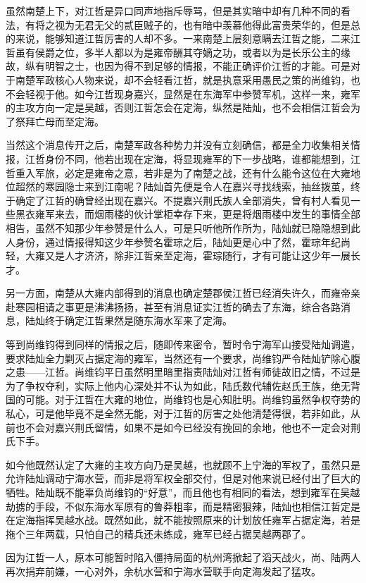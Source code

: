 虽然南楚上下，对江哲是异口同声地指斥辱骂，但是其实暗中却有几种不同的看法，有将之视为无君无父的贰臣贼子的，也有暗中羡慕他得此富贵荣华的，但是总的来说，能够知道江哲厉害的人却不多。一来南楚上层刻意瞒去江哲之能，二来江哲虽有侯爵之位，多半人都以为是雍帝酬其夺嫡之功，或者以为是长乐公主的缘故，纵有明智之士，也因为得不到足够的情报，不能正确评价江哲的才能。可是对于南楚军政核心人物来说，却不会轻看江哲，就是执意采用愚民之策的尚维钧，也不会轻视于他。如今江哲现身嘉兴，显然是在东海军中参赞军机，这样一来，雍军的主攻方向一定是吴越，否则江哲怎会在定海，纵然是陆灿，也不会相信江哲会为了祭拜亡母而至定海。

当然这个消息传开之后，南楚军政各种势力并没有立刻确信，都是全力收集相关情报，江哲身份不同，他若出现在定海，将显现雍军的下一步战略，谁都能想到，江哲重入军旅，必定是雍帝之意，若非是为了南楚之战，还有什么能令这位在大雍地位超然的寒园隐士来到江南呢？陆灿首先便是令人在嘉兴寻找线索，抽丝拨茧，终于确定了江哲的确曾经出现在嘉兴。不提嘉兴荆氏族人全部消失，曾有村人看见一些黑衣雍军来去，而烟雨楼的伙计掌柜幸存下来，更是将烟雨楼中发生的事情全部相告，虽然不知那少年参赞是什么人，可是只听他所作所为，陆灿就已隐隐想到此人身份，通过情报得知这少年参赞名霍琮之后，陆灿更是心中了然，霍琮年纪尚轻，大雍又是人才济济，除非江哲亲至定海，霍琮随行，才有可能让这少年一展长才。

另一方面，南楚从大雍内部得到的消息也确定楚郡侯江哲已经消失许久，而雍帝亲赴寒园相请之事更是沸沸扬扬，甚至有消息证实江哲的确去了东海，综合各路消息，陆灿终于确定江哲果然是随东海水军来了定海。

等到尚维钧得到同样的情报之后，随即传来密令，暂时令宁海军山接受陆灿调遣，要求陆灿全力剿灭占据定海的雍军，当然还有一个要求，尚维钧严令陆灿铲除心腹之患——江哲。尚维钧平日虽然明里暗里指责陆灿对江哲有师徒故旧之情，不过是为了争权夺利，实际上他内心深处并不认为如此，陆氏数代辅佐赵氏王族，绝无背国的可能。对于江哲在大雍的地位，尚维钧也是心知肚明。尚维钧虽然争权夺势的私心，可是他毕竟不是全然无能，对于江哲的厉害之处他清楚得很，若非如此，从前也不会对嘉兴荆氏留情，如果不是如今已经没有挽回的余地，他也不一定会对荆氏下手。

如今他既然认定了大雍的主攻方向乃是吴越，也就顾不上宁海的军权了，虽然只是允许陆灿调动宁海水营，而非是将军权全部交付，但是对他来说已经付出了巨大的牺牲。陆灿既不能辜负尚维钧的“好意”，而且他也有相同的看法，想到雍军在吴越劫掳的手段，不似东海水军原有的鲁莽粗率，而是精密狠辣，陆灿也相信江哲定是在定海指挥吴越水战。既然如此，就不能按照原来的计划放任雍军占据定海，若是拖个三年两载，只怕自己的精兵还未练成，雍军已经占据吴越两郡了。

因为江哲一人，原本可能暂时陷入僵持局面的杭州湾掀起了滔天战火，尚、陆两人再次捐弃前嫌，一心对外，余杭水营和宁海水营联手向定海发起了猛攻。

